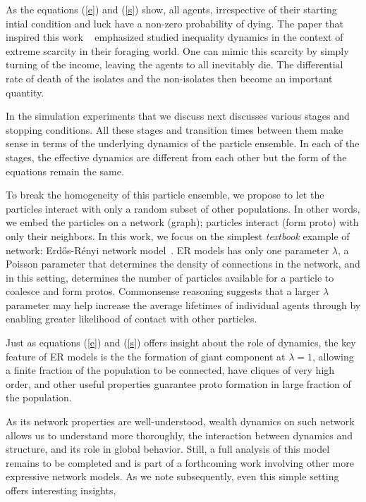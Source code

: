 \documentclass[sigconf]{acmart}
\begin{document}
As the equations (\ref{e}) and (\ref{s}) show, all agents, irrespective of their starting intial condition and luck have a non-zero probability of dying. The paper that inspired this work ~\cite{srimil} emphasized studied inequality dynamics in the context of extreme scarcity in their foraging world. One can mimic this scarcity by simply turning of the income, leaving the agents to all inevitably die. The differential rate of death of the isolates and the non-isolates then become an important quantity. 

In the simulation experiments that we discuss next discusses various stages and stopping conditions. All these stages and transition times between them make sense in terms of the underlying dynamics of the particle ensemble. In each of the stages, the effective dynamics are different from each other but the form of the equations remain the same. 

To break the homogeneity of this particle ensemble, we propose to let the particles interact with only  a random subset of other populations. In other words, we embed the particles on a network (graph); particles interact (form proto) with only their neighbors. In this work, we focus on the simplest \textit{textbook} example of network: Erd\H{o}s-R\'{e}nyi network model~\cite{newman2018networks}. ER models has only one parameter $\lambda$, a Poisson parameter that determines the density of connections in the network, and in this setting, determines the number of particles available for a particle to coalesce and form protos. Commonsense reasoning suggests that a larger $\lambda$ parameter may help increase the average lifetimes of individual agents through by enabling greater likelihood of contact with other particles. 

Just as equations (\ref{e}) and (\ref{s}) offers insight about the role of dynamics, the key feature of ER models is the the formation of giant component at $\lambda=1$, allowing a finite fraction of the population to be connected, have cliques of very high order, and other useful properties guarantee proto formation in large fraction of the population.  

As its network properties are well-understood, wealth dynamics on such network allows us to understand more thoroughly, the interaction between dynamics and structure, and its role in global behavior. Still, a full analysis of this model remains to be completed and is part of a forthcoming work involving other more expressive network models. As we note subsequently, even this simple setting offers interesting insights,
\end{document}
